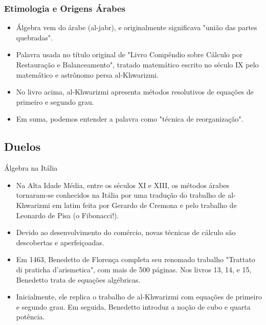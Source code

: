 \documentclass[article]{beamer}%
\begin{document}

\begin{frame}
\frametitle{Etimologia e Origens Árabes}

\begin{itemize}[<+->]
    \item Álgebra vem do árabe  (al-jabr), e originalmente significava "união das partes quebradas".

    \item Palavra usada no título original de "Livro Compêndio sobre Cálculo por Restauração e Balanceamento", tratado matemático escrito no século IX pelo matemático e astrônomo persa al-Khwarizmi.

    \item No livro acima, al-Khwarizmi apresenta métodos resolutivos de equações de primeiro e segundo grau.

    \item Em suma, podemos entender a palavra como "técnica de reorganização".
\end{itemize}

\end{frame}


\subsection{Duelos}
\begin{frame}{Álgebra na Itália}

\begin{itemize}[<+->]
    \item Na Alta Idade Média, entre os séculos XI e XIII, os métodos árabes tornaram-se conhecidos na Itália por uma tradução do trabalho de al-Khwarizmi em latim feita por Gerardo de Cremona e pelo trabalho de Leonardo de Pisa (o Fibonacci!).

    \item Devido ao desenvolvimento do comércio, novas técnicas de cálculo são descobertas e aperfeiçoadas.

    \item Em 1463, Benedetto de Florença completa seu renomado trabalho "Trattato di praticha d'arismetica", com mais de 500 páginas. Nos livros 13, 14, e 15, Benedetto trata de equações algébricas.

    \item Inicialmente, ele replica o trabalho de al-Khwarizmi com equações de primeiro e segundo grau. Em seguida, Benedetto introduz a noção de cubo e quarta potência.
\end{itemize}
    
\end{frame}
\end{document}
